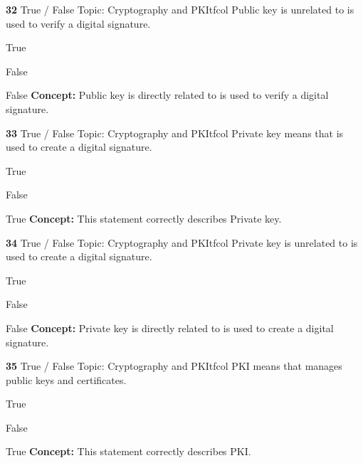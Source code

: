 \documentclass[10pt,a4paper]{article}
\begin{document}
\begin{qcard}{\color{white}\textbf{32} \hfill \small True / False \textbar{} Topic: Cryptography and PKI}{tfcol}
Public key is unrelated to is used to verify a digital signature.

\begin{qoptions}
\item True
\item False
\end{qoptions}
\begin{explainbox}{False}
\textbf{Concept:} Public key is directly related to is used to verify a digital signature.
\end{explainbox}
\end{qcard}

\begin{qcard}{\color{white}\textbf{33} \hfill \small True / False \textbar{} Topic: Cryptography and PKI}{tfcol}
Private key means that is used to create a digital signature.

\begin{qoptions}
\item True
\item False
\end{qoptions}
\begin{explainbox}{True}
\textbf{Concept:} This statement correctly describes Private key.
\end{explainbox}
\end{qcard}

\begin{qcard}{\color{white}\textbf{34} \hfill \small True / False \textbar{} Topic: Cryptography and PKI}{tfcol}
Private key is unrelated to is used to create a digital signature.

\begin{qoptions}
\item True
\item False
\end{qoptions}
\begin{explainbox}{False}
\textbf{Concept:} Private key is directly related to is used to create a digital signature.
\end{explainbox}
\end{qcard}

\begin{qcard}{\color{white}\textbf{35} \hfill \small True / False \textbar{} Topic: Cryptography and PKI}{tfcol}
PKI means that manages public keys and certificates.

\begin{qoptions}
\item True
\item False
\end{qoptions}
\begin{explainbox}{True}
\textbf{Concept:} This statement correctly describes PKI.
\end{explainbox}
\end{qcard}
\end{document}
